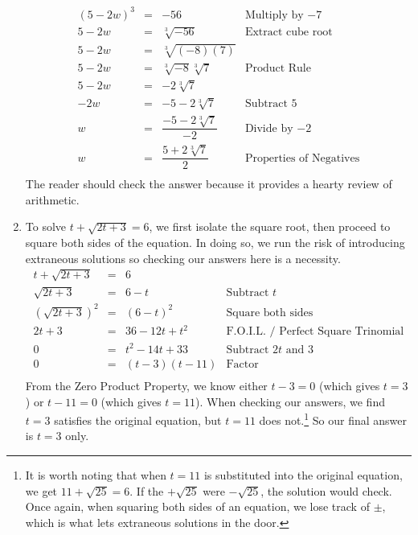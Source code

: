 \begin{ex}
\begin{enumerate}
\[\begin{array}{rclr}
(5-2w) ^ 3 & = & -56 & \text{Multiply by $-7$} \\[2pt]

5 - 2w & = & \sqrt[3]{-56} & \text{Extract cube root} \\[2pt]

5 - 2w & = & \sqrt[3]{(-8)(7)} & \\[2pt]

5 - 2w & = & \sqrt[3]{-8} \sqrt[3]{7} & \text{Product Rule}\\[2pt]

5 - 2w & = & -2\sqrt[3]{7} & \\[2pt]

-2w & = & -5-2 \sqrt[3]{7} & \text{Subtract $5$} \\[2pt]

w & = & \dfrac{-5 - 2\sqrt[3]{7}}{-2} & \text{Divide by $-2$} \\[8pt]

w & = & \dfrac{5 + 2\sqrt[3]{7}}{2} & \text{Properties of Negatives} \\

\end{array}\] The reader should check the answer because it provides a hearty review of arithmetic.

\item  To solve  $t + \sqrt{2t+3} = 6$, we first isolate the square root, then proceed to square both sides of the equation.  In doing so, we run the risk of introducing extraneous solutions so checking our answers here is a necessity. \[ \begin{array}{rclr}

t + \sqrt{2t+3}  & = & 6 & \\ [2pt]

\sqrt{2t+3} & = & 6 - t & \text{Subtract $t$} \\ [2pt]

(\sqrt{2t+3})^2 & = & (6-t)^2 & \text{Square both sides} \\ [2pt]

2t + 3 & = & 36-12t + t^2 & \text{F.O.I.L. / Perfect Square Trinomial} \\ [2pt]

0 & = & t^2 - 14t + 33 & \text{Subtract $2t$ and $3$} \\ [2pt]

0 & = & (t-3)(t-11) & \text{Factor} \\ \end{array} \] From the Zero Product Property, we know either $t - 3 = 0$ (which gives $t=3$) or $t-11 = 0$ (which gives $t=11$).  When checking our answers, we find $t = 3$ satisfies the original equation, but $t = 11$ does not.\footnote{It is worth noting that when $t=11$ is substituted into the original equation, we get $11 + \sqrt{25} = 6$.  If the $+\sqrt{25}$ were $-\sqrt{25}$, the solution would check. Once again, when squaring both sides of an equation, we lose track of $\pm$, which is what lets extraneous solutions in the door.}  So our final answer is $t = 3$ only.


\end{enumerate}
\end{ex}
